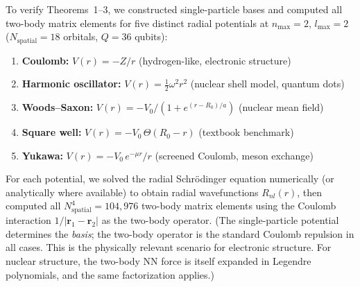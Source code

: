 \documentclass[twocolumn,pra,amsmath,amssymb,superscriptaddress]{revtex4-2}
\begin{document}
To verify Theorems~1--3, we constructed single-particle bases and
computed all two-body matrix elements for five distinct radial
potentials at $n_{\max} = 2$, $l_{\max} = 2$ ($N_{\mathrm{spatial}} = 18$
orbitals, $Q = 36$ qubits):

\begin{enumerate}
\item \textbf{Coulomb:} $V(r) = -Z/r$ (hydrogen-like,
  electronic structure)
\item \textbf{Harmonic oscillator:} $V(r) = \tfrac{1}{2}\omega^2 r^2$
  (nuclear shell model, quantum dots)
\item \textbf{Woods--Saxon:}
  $V(r) = -V_0 / (1 + e^{(r-R_0)/a})$ (nuclear mean field)
\item \textbf{Square well:}
  $V(r) = -V_0\, \Theta(R_0 - r)$ (textbook benchmark)
\item \textbf{Yukawa:}
  $V(r) = -V_0\, e^{-\mu r}/r$ (screened Coulomb, meson exchange)
\end{enumerate}

For each potential, we solved the radial Schr\"odinger equation
numerically (or analytically where available) to obtain radial
wavefunctions $R_{nl}(r)$, then computed all
$N_{\mathrm{spatial}}^4 = 104{,}976$ two-body matrix elements using
the Coulomb interaction $1/|\mathbf{r}_1 - \mathbf{r}_2|$ as the
two-body operator.  (The single-particle potential determines the
\textit{basis}; the two-body operator is the standard Coulomb
repulsion in all cases.  This is the physically relevant scenario
for electronic structure.  For nuclear structure, the two-body NN
force is itself expanded in Legendre polynomials, and the same
factorization applies.)
\end{document}
